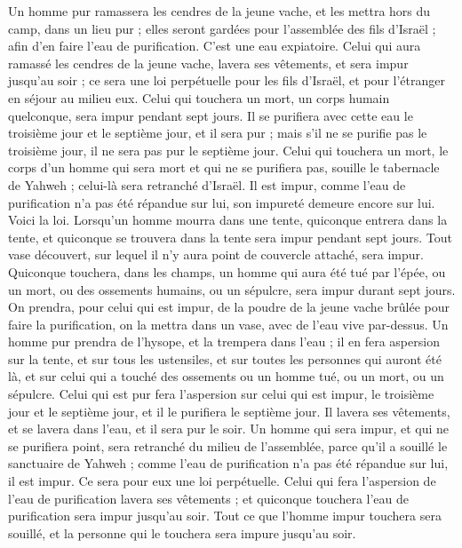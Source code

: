\begin{multicols}{2}
Un homme pur ramassera les cendres de la jeune vache, et les mettra hors du camp, dans un lieu pur ; elles seront gardées pour l'assemblée des fils d'Israël ; afin d'en faire l'eau de purification. C’est une eau expiatoire.
Celui qui aura ramassé les cendres de la jeune vache, lavera ses vêtements, et sera impur jusqu'au soir ; ce sera une loi perpétuelle pour les fils d'Israël, et pour l'étranger en séjour au milieu eux.
Celui qui touchera un mort, un corps humain quelconque, sera impur pendant sept jours.
Il se purifiera avec cette eau le troisième jour et le septième jour, et il sera pur ; mais s'il ne se purifie pas le troisième jour, il ne sera pas pur le septième jour.
Celui qui touchera un mort, le corps d’un homme qui sera mort et qui ne se purifiera pas, souille le tabernacle de Yahweh ; celui-là sera retranché d'Israël. Il est impur, comme l'eau de purification n'a pas été répandue sur lui, son impureté demeure encore sur lui.
Voici la loi. Lorsqu’un homme mourra dans une tente, quiconque entrera dans la tente, et quiconque se trouvera dans la tente sera impur pendant sept jours.
Tout vase découvert, sur lequel il n'y aura point de couvercle attaché, sera impur.
Quiconque touchera, dans les champs, un homme qui aura été tué par l'épée, ou un mort, ou des ossements humains, ou un sépulcre, sera impur durant sept jours.
On prendra, pour celui qui est impur, de la poudre de la jeune vache brûlée pour faire la purification, on la mettra dans un vase, avec de l'eau vive par-dessus.
Un homme pur prendra de l'hysope, et la trempera dans l'eau ; il en fera aspersion sur la tente, et sur tous les ustensiles, et sur toutes les personnes qui auront été là, et sur celui qui a touché des ossements ou un homme tué, ou un mort, ou un sépulcre.
Celui qui est pur fera l’aspersion sur celui qui est impur, le troisième jour et le septième jour, et il le purifiera le septième jour. Il lavera ses vêtements, et se lavera dans l'eau, et il sera pur le soir.
Un homme qui sera impur, et qui ne se purifiera point, sera retranché du milieu de l'assemblée, parce qu'il a souillé le sanctuaire de Yahweh ; comme l'eau de purification n'a pas été répandue sur lui, il est impur.
Ce sera pour eux une loi perpétuelle. Celui qui fera l’aspersion de l'eau de purification lavera ses vêtements ; et quiconque touchera l'eau de purification sera impur jusqu'au soir.
Tout ce que l'homme impur touchera sera souillé, et la personne qui le touchera sera impure jusqu'au soir.

\end{multicols}
